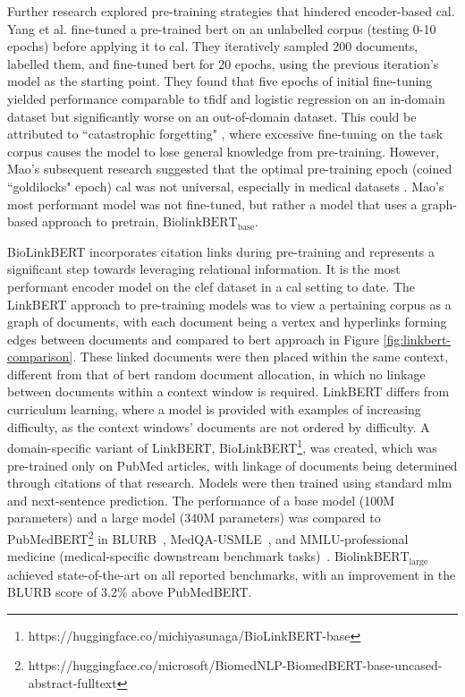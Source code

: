 \documentclass[10pt,oneside]{book}
\begin{document}
Further research explored pre-training strategies that hindered encoder-based \gls*{cal}. Yang et al. \cite{yang_goldilocks_2022} fine-tuned a pre-trained \gls*{bert} on an unlabelled corpus (testing 0-10 epochs) before applying it to \gls*{cal}. They iteratively sampled 200 documents, labelled them, and fine-tuned \gls*{bert} for 20 epochs, using the previous iteration's model as the starting point. They found that five epochs of initial fine-tuning yielded performance comparable to \gls*{tfidf} and logistic regression on an in-domain dataset but significantly worse on an out-of-domain dataset. This could be attributed to ``catastrophic forgetting" \cite{xu_forget_2020}, where excessive fine-tuning on the task corpus causes the model to lose general knowledge from pre-training. However, Mao's subsequent research suggested that the optimal pre-training epoch (coined ``goldilocks" epoch) \gls*{cal} was not universal, especially in medical datasets \cite{mao_reproducibility_2024}. Mao's most performant model was not fine-tuned, but rather a model that uses a graph-based approach to pretrain, ${\text{BiolinkBERT}}_{\text{base}}$.

BioLinkBERT incorporates citation links during pre-training and represents a significant step towards leveraging relational information. It is the most performant encoder model on the \gls*{clef} dataset in a \gls*{cal} setting to date. The LinkBERT approach to pre-training models was to view a pertaining corpus as a graph of documents, with each document being a vertex and hyperlinks forming edges between documents \cite{yasunaga_linkbert_2022} and compared to \gls*{bert} approach in Figure \ref{fig:linkbert-comparison}. These linked documents were then placed within the same context, different from that of \gls*{bert} random document allocation, in which no linkage between documents within a context window is required. LinkBERT differs from curriculum learning, where a model is provided with examples of increasing difficulty, as the context windows' documents are not ordered by difficulty. A domain-specific variant of LinkBERT, BioLinkBERT\footnote{https://huggingface.co/michiyasunaga/BioLinkBERT-base}, was created, which was pre-trained only on PubMed articles, with linkage of documents being determined through citations of that research. Models were then trained using standard \gls*{mlm} and next-sentence prediction. The performance of a base model (100M parameters) and a large model (340M parameters) was compared to PubMedBERT\footnote{https://huggingface.co/microsoft/BiomedNLP-BiomedBERT-base-uncased-abstract-fulltext} in BLURB~\cite{gu_domain-specific_2021}, MedQA-USMLE~\cite{jin_what_2021}, and MMLU-professional medicine (medical-specific downstream benchmark tasks)~\cite{hendrycks_measuring_2021}. ${\text{BiolinkBERT}}_{\text{large}}$ achieved state-of-the-art on all reported benchmarks, with an improvement in the BLURB score of 3.2\% above PubMedBERT.
\end{document}

